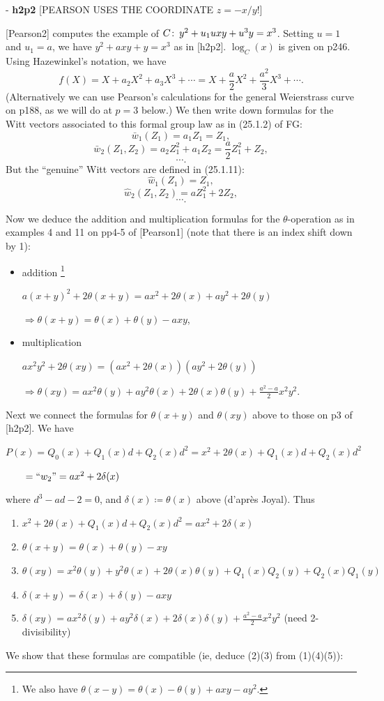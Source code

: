 \documentclass{rs}
\theoremstyle{definition}
\theoremstyle{remark}
\def\co{\colon\thinspace}
\renewcommand{\=}{\approx}
\renewcommand{\-}{\sim}
\numberwithin{equation}{section}
\numberwithin{thm}{section}
\begin{document}
- \textbf{h2p2} [PEARSON USES THE COORDINATE $z = - x/y$!]

[Pearson2] computes the example of $C\co y^2 + u_1 u x y + u^3 y = x^3$. Setting $u = 1$ and $u_1 = a$, we have $y^2 + a x y + y = x^3$ as in [h2p2]. 
$\log_C(x)$ is given on p246. Using Hazewinkel's notation, we have
\[
 f(X) = X + a_2 X^2 + a_3 X^3 + \cdots = X + \frac{a}{2} X^2 + \frac{a^2}{3} X^3 + \cdots.
\]
(Alternatively we can use Pearson's calculations for the general Weierstrass curve on p188, as we will do at $p = 3$ below.) 
We then write down formulas for the Witt vectors associated to this formal group law as in (25.1.2) of FG:
\[
 \bar{w}_1(Z_1) = a_1 Z_1 = Z_1,
\]
\[
 \bar{w}_2(Z_1,Z_2) = a_2 Z_1^2 + a_1 Z_2 = \frac{a}{2} Z_1^2 + Z_2,
\]
\[
 \cdots.
\]
But the ``genuine'' Witt vectors are defined in (25.1.11):
\[
 \hat{w}_1(Z_1) = Z_1,
\]
\[
 \hat{w}_2(Z_1,Z_2) = a Z_1^2 + 2 Z_2,
\]
\[
 \cdots.
\]

Now we deduce the addition and multiplication formulas for the $\theta$-operation as in examples 4 and 11 on pp4-5 of [Pearson1] (note that there is an index shift down by 1):
\begin{itemize}
\item addition \footnote{We also have $\theta(x - y) = \theta(x) - \theta(y) + a x y - a y^2$.}

$a (x + y)^2 + 2 \theta(x + y) = a x^2 + 2 \theta(x) + a y^2 + 2 \theta(y)$

$\Rightarrow \theta(x + y) = \theta(x) + \theta(y) - a x y$,

\item multiplication

$a x^2 y^2 + 2 \theta (x y) = (a x^2 + 2 \theta(x)) (a y^2 + 2 \theta(y))$

$\Rightarrow \theta(x y) = a x^2 \theta(y) + a y^2 \theta(x) + 2 \theta(x) \theta(y) + \frac{a^2 - a}{2} x^2 y^2$.
\end{itemize}

Next we connect the formulas for $\theta(x + y)$ and $\theta(x y)$ above to those on p3 of [h2p2]. We have

$P(x) = Q_0(x) + Q_1(x) d + Q_2(x) d^2 = x^2 + 2 \theta(x) + Q_1(x) d + Q_2(x) d^2$

$~~~~~~= ``w_2" = a x^2 + 2 \delta(x)$

where $d^3 - a d - 2 = 0$, and $\delta(x) \coloneqq \theta(x)$ above (d'apr\`es Joyal). Thus
\begin{enumerate}
\item $x^2 + 2 \theta(x) + Q_1(x) d + Q_2(x) d^2 = a x^2 + 2 \delta(x)$
\item $\theta(x + y) = \theta(x) + \theta(y) - x y$
\item $\theta(x y) = x^2 \theta(y) + y^2 \theta(x) + 2 \theta(x) \theta(y) + Q_1(x) Q_2(y) + Q_2(x) Q_1(y)$
\item $\delta(x + y) = \delta(x) + \delta(y) - a x y$
\item $\delta(x y) = a x^2 \delta(y) + a y^2 \delta(x) + 2 \delta(x) \delta(y) + \frac{a^2 - a}{2} x^2 y^2$ (need 2-divisibility)
\end{enumerate}
We show that these formulas are compatible (ie, deduce (2)(3) from (1)(4)(5)):
\end{document}
